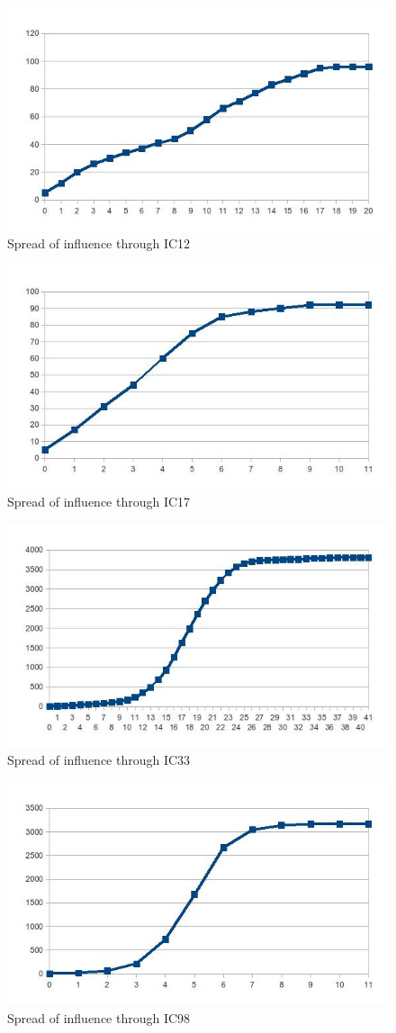 \begin{figure}[htbp]%
\centering
\includegraphics[width=0.5\columnwidth]{./img/ic12}%
\caption{Spread of influence through IC12}%
\label{fig:ic12}%
\end{figure}

\begin{figure}[htbp]%
\centering
\includegraphics[width=0.5\columnwidth]{./img/ic17}%
\caption{Spread of influence through IC17}%
\label{fig:ic17}%
\end{figure}

\begin{figure}[htbp]%
\centering
\includegraphics[width=0.5\columnwidth]{./img/ic33}%
\caption{Spread of influence through IC33}%
\label{fig:ic33}%
\end{figure}

\begin{figure}[htbp]%
\centering
\includegraphics[width=0.5\columnwidth]{./img/ic98}%
\caption{Spread of influence through IC98}%
\label{fig:ic98}%
\end{figure}

